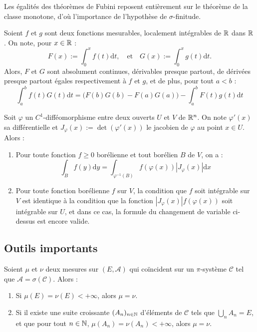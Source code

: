 \documentclass[11pt,a4paper]{article}
\begin{document}
\begin{rmq}
Les égalités des théorèmes de Fubini reposent entièrement sur le théorème de la classe monotone, d'où l'importance de l'hypothèse de $\sigma$-finitude.
\end{rmq}

\begin{corstar}
Soient $f$ et $g$ sont deux fonctions mesurables, localement intégrables de $\mathbb R$ dans $\mathbb R$. On note, pour $x \in \mathbb R$ : \[ F(x) := \int_0^x f(t)\mathrm{d}t, \quad \text{et} \quad G(x) := \int_0^x g(t)\mathrm{d}t.\]
Alors, $F$ et $G$ sont absolument continues, dérivables presque partout, de dérivées presque partout égales respectivement à $f$ et $g$, et de plus, pour tout $a < b$ :
\[\int_a^b f(t)G(t)\mathrm{d}t = \Big(F(b)G(b)-F(a)G(a)\Big) - \int_a^b F(t)g(t)\mathrm{d}t\]
\end{corstar}

\begin{thmstar}
Soit $\varphi$ un $C^1$-difféomorphisme entre deux ouverts $U$ et $V$ de $\mathbb R^n$. On note $\varphi'(x)$ sa différentielle et $J_\varphi(x):=\det\left(\varphi'(x)\right)$ le jacobien de $\varphi$ au point $x\in U$. Alors :
\begin{enumerate}
\item Pour toute fonction $f\geq 0$ borélienne et tout borélien $B$ de $V$, on a :
\[\int_B f(y)\mathrm{d}y = \int_{\varphi^{-1}(B)}f(\varphi(x)) |J_\varphi(x)|\mathrm{d}x\]
\item Pour toute fonction borélienne $f$ sur $V$, la condition que $f$ soit intégrable sur $V$ est identique à la condition que la fonction $|J_\varphi(x)|f(\varphi(x))$ soit intégrable sur $U$, et dans ce cas, la formule du changement de variable ci-dessus est encore valide.
\end{enumerate}
\end{thmstar}


\subsection*{Outils importants}


\begin{corstar} Soient $\mu$ et $\nu$ deux mesures sur $(E,\mathcal{A})$ qui coïncident sur un $\pi$-système $\mathcal{C}$ tel que $\mathcal{A}=\sigma(\mathcal{C})$. Alors :
\begin{enumerate}
\item Si $\mu(E)=\nu(E) < +\infty$, alors $\mu = \nu$.
\item Si il existe une suite croissante $(A_n)_{n\in\mathbb N}$ d'éléments de $\mathcal{C}$ tels que $\displaystyle \bigcup_n A_n = E$, et que pour tout $n\in\mathbb N$, $\mu(A_n)=\nu(A_n)<+\infty$, alors $\mu = \nu$.
\end{enumerate}
\end{corstar}
\end{document}
